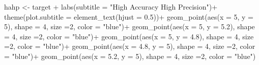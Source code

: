 \documentclass[
  letterpaper,
]{book}
\newenvironment{Shaded}{\begin{snugshade}}{\end{snugshade}}
\newcommand{\AttributeTok}[1]{\textcolor[rgb]{0.40,0.45,0.13}{#1}}
\newcommand{\DecValTok}[1]{\textcolor[rgb]{0.68,0.00,0.00}{#1}}
\newcommand{\FloatTok}[1]{\textcolor[rgb]{0.68,0.00,0.00}{#1}}
\newcommand{\FunctionTok}[1]{\textcolor[rgb]{0.28,0.35,0.67}{#1}}
\newcommand{\NormalTok}[1]{\textcolor[rgb]{0.00,0.23,0.31}{#1}}
\newcommand{\OtherTok}[1]{\textcolor[rgb]{0.00,0.23,0.31}{#1}}
\newcommand{\SpecialCharTok}[1]{\textcolor[rgb]{0.37,0.37,0.37}{#1}}
\newcommand{\StringTok}[1]{\textcolor[rgb]{0.13,0.47,0.30}{#1}}
\begin{document}
\begin{Shaded}
\begin{Highlighting}[]
\NormalTok{hahp }\OtherTok{\textless{}{-}}\NormalTok{ target }\SpecialCharTok{+}
  \FunctionTok{labs}\NormalTok{(}\AttributeTok{subtitle =} \StringTok{"High Accuracy High Precision"}\NormalTok{)}\SpecialCharTok{+}
  \FunctionTok{theme}\NormalTok{(}\AttributeTok{plot.subtitle =} \FunctionTok{element\_text}\NormalTok{(}\AttributeTok{hjust =} \FloatTok{0.5}\NormalTok{))}\SpecialCharTok{+}
  \FunctionTok{geom\_point}\NormalTok{(}\FunctionTok{aes}\NormalTok{(}\AttributeTok{x =} \DecValTok{5}\NormalTok{, }\AttributeTok{y =} \DecValTok{5}\NormalTok{), }\AttributeTok{shape =} \DecValTok{4}\NormalTok{, }\AttributeTok{size =}\DecValTok{2}\NormalTok{, }\AttributeTok{color =} \StringTok{"blue"}\NormalTok{)}\SpecialCharTok{+}
  \FunctionTok{geom\_point}\NormalTok{(}\FunctionTok{aes}\NormalTok{(}\AttributeTok{x =} \DecValTok{5}\NormalTok{, }\AttributeTok{y =} \FloatTok{5.2}\NormalTok{), }\AttributeTok{shape =} \DecValTok{4}\NormalTok{, }\AttributeTok{size =}\DecValTok{2}\NormalTok{, }\AttributeTok{color =} \StringTok{"blue"}\NormalTok{)}\SpecialCharTok{+}
  \FunctionTok{geom\_point}\NormalTok{(}\FunctionTok{aes}\NormalTok{(}\AttributeTok{x =} \DecValTok{5}\NormalTok{, }\AttributeTok{y =} \FloatTok{4.8}\NormalTok{), }\AttributeTok{shape =} \DecValTok{4}\NormalTok{, }\AttributeTok{size =}\DecValTok{2}\NormalTok{, }\AttributeTok{color =} \StringTok{"blue"}\NormalTok{)}\SpecialCharTok{+}
  \FunctionTok{geom\_point}\NormalTok{(}\FunctionTok{aes}\NormalTok{(}\AttributeTok{x =} \FloatTok{4.8}\NormalTok{, }\AttributeTok{y =} \DecValTok{5}\NormalTok{), }\AttributeTok{shape =} \DecValTok{4}\NormalTok{, }\AttributeTok{size =}\DecValTok{2}\NormalTok{, }\AttributeTok{color =} \StringTok{"blue"}\NormalTok{)}\SpecialCharTok{+}
  \FunctionTok{geom\_point}\NormalTok{(}\FunctionTok{aes}\NormalTok{(}\AttributeTok{x =} \FloatTok{5.2}\NormalTok{, }\AttributeTok{y =} \DecValTok{5}\NormalTok{), }\AttributeTok{shape =} \DecValTok{4}\NormalTok{, }\AttributeTok{size =}\DecValTok{2}\NormalTok{, }\AttributeTok{color =} \StringTok{"blue"}\NormalTok{)}



\end{Highlighting}
\end{Shaded}
\end{document}
